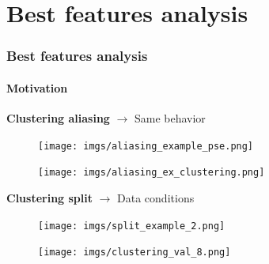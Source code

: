 \documentclass{beamer}
\begin{document}

\section{Best features analysis}

\begin{frame}
	\frametitle{Best features analysis}
	\framesubtitle{Motivation}

\textbf{Clustering aliasing} $\rightarrow$ Same behavior
	\begin{multicols}{2}
		\begin{figure}
			\texttt{[image: imgs/aliasing\_example\_pse.png]}
		\end{figure}
		\columnbreak
		\begin{figure}
			\texttt{[image: imgs/aliasing\_ex\_clustering.png]}
		\end{figure}
	\end{multicols}
\vfill
\pause
\textbf{Clustering split} $\rightarrow$ Data conditions
	\begin{multicols}{2}
		\begin{figure}
			\texttt{[image: imgs/split\_example\_2.png]}
		\end{figure}
		\columnbreak
		\begin{figure}
			\texttt{[image: imgs/clustering\_val\_8.png]}
		\end{figure}
	\end{multicols}
\end{frame}
\end{document}
